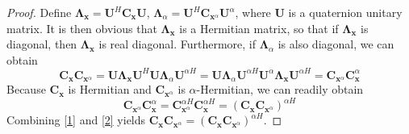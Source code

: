 \documentclass[review]{elsarticle}
\theoremstyle{plain}
\theoremstyle{remark}
\newtheorem{rem}{\protect\remarkname}
\theoremstyle{plain}
\theoremstyle{definition}
\theoremstyle{prop}
\theoremstyle{definition}
\theoremstyle{plain}
\theoremstyle{plain}
\providecommand{\remarkname}{Remark}
\begin{document}
\begin{proof}
Define $\mathbf{\Lambda}_\mathbf{x}=\mathbf{U}^H\mathbf{C}_\mathbf{x}\mathbf{U}$, $\mathbf{\Lambda}_\alpha=\mathbf{U}^{H}\mathbf{C}_{\mathbf{x}^{\alpha}}\mathbf{U}^\alpha$, where $\mathbf{U}$ is a quaternion unitary matrix. It is then obvious that $\mathbf{\Lambda}_\mathbf{x}$ is a Hermitian matrix, so that if $\mathbf{\Lambda}_\mathbf{x}$ is diagonal, then $\mathbf{\Lambda}_\mathbf{x}$ is real diagonal. Furthermore, if $\mathbf{\Lambda}_\alpha$ is also diagonal, we can obtain
\begin{equation}\label{1}
\mathbf{C}_\mathbf{x}\mathbf{C}_{\mathbf{x}^{\alpha}}\!=\!\mathbf{U}\!\boldsymbol{\Lambda}_\mathbf{x}\!\mathbf{U}^H\!\mathbf{U}\!\boldsymbol{\Lambda}_\alpha\!\mathbf{U}^{\alpha H}\!\!=\!\!\mathbf{U}\!\boldsymbol{\Lambda}_\alpha\!\mathbf{U}^{\alpha H}\!\mathbf{U}^{\alpha}\!\boldsymbol{\Lambda}_\mathbf{x}\!\mathbf{U}^{\alpha H}\!=\!\mathbf{C}_{\mathbf{x}^{\alpha}}\mathbf{C}_\mathbf{x}^\alpha
\end{equation}
Because $\mathbf{C}_{\mathbf{x}}$ is Hermitian and $\mathbf{C}_{\mathbf{x}^{\alpha}}$ is $\alpha$-Hermitian, we can readily obtain
\begin{equation}\label{2}
\mathbf{C}_{\mathbf{x}^{\alpha}}\mathbf{C}_\mathbf{x}^\alpha=\mathbf{C}_{\mathbf{x}^{\alpha}}^{\alpha H}\mathbf{C}_\mathbf{x}^{\alpha H}=(\mathbf{C}_\mathbf{x}\mathbf{C}_{\mathbf{x}^{\alpha}})^{\alpha H}
\end{equation}
Combining \eqref{1} and \eqref{2} yields $\mathbf{C}_{\mathbf{x}}\mathbf{C}_{\mathbf{x}^\alpha}=(\mathbf{C}_\mathbf{x}\mathbf{C}_{\mathbf{x}^{\alpha}})^{\alpha H}$.
\end{proof}
\end{document}

